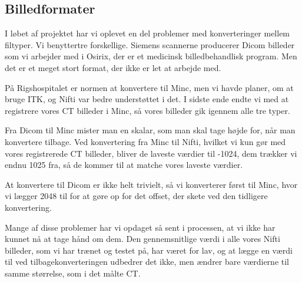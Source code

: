 \subsection{Billedformater}

I løbet af projektet har vi oplevet en del problemer med konverteringer
mellem filtyper. Vi benyttertre forskellige. Siemens scannerne producerer
Dicom billeder som vi arbejder med i Osirix, der er et medicinsk
billedbehandlisk program. Men det er et meget stort format, der ikke er
let at arbejde med. 

På Rigshospitalet er normen at konvertere til Minc, men vi havde planer,
om at bruge ITK, og Nifti var bedre understøttet i det. I sidste ende
endte vi med at registrere vores CT billeder i Minc, så vores billeder gik
igennem alle tre typer. 

Fra Dicom til Minc mister man en skalar, som man skal tage højde for, når
man konvertere tilbage. Ved konvertering fra Minc til Nifti, hvilket vi
kun gør med vores registrerede CT billeder, bliver de laveste værdier til
-1024, dem trækker vi endnu 1025 fra, så de kommer til at matche vores
laveste værdier.


At konvertere til Dicom er ikke helt trivielt, så vi konverterer først til
Minc, hvor vi lægger 2048 til for at gøre op for det offset, der skete ved
den tidligere konvertering. 

Mange af disse problemer har vi opdaget så sent i processen, at vi ikke
har kunnet nå at tage hånd om dem. Den gennemsnitlige værdi i alle vores
Nifti billeder, som vi har trænet og testet på, har været for lav, og at
lægge en værdi til ved tilbagekonverteringen udbedrer det ikke, men ændrer
bare værdierne til samme størrelse, som i det målte CT.



